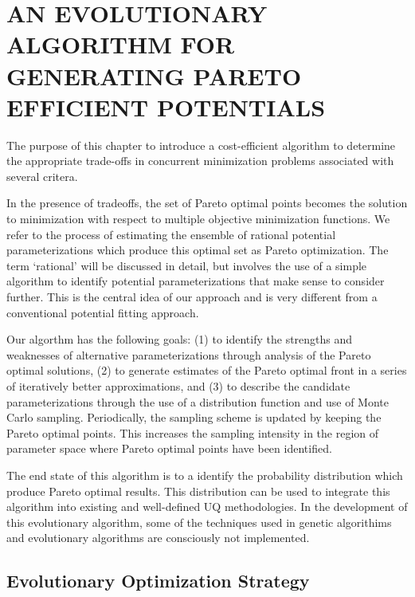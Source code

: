 \chapter{AN EVOLUTIONARY ALGORITHM FOR GENERATING PARETO EFFICIENT POTENTIALS}
\label{ch:methodology}

The purpose of this chapter to introduce a cost-efficient algorithm to determine the appropriate trade-offs in concurrent minimization problems associated with several critera.

In the presence of tradeoffs, the set of Pareto optimal points becomes the solution to minimization with respect to multiple objective minimization functions.  We refer to the process of estimating the ensemble of rational potential parameterizations which produce this optimal set as Pareto optimization.   The term ‘rational’ will be discussed in detail, but involves the use of a simple algorithm to identify potential parameterizations that make sense to consider further. This is the central idea of our approach and is very different from a conventional potential fitting approach.

Our algorthm has the following goals: (1) to identify the strengths and weaknesses of alternative parameterizations through analysis of the Pareto optimal solutions, (2) to generate estimates of the Pareto optimal front in a series of iteratively better approximations, and (3) to describe the candidate parameterizations through the use of a distribution function and use of Monte Carlo sampling.  Periodically, the sampling scheme is updated by keeping the Pareto optimal points.  This increases the sampling intensity in the region of parameter space where Pareto optimal points have been identified.

The end state of this algorithm is to a identify the probability distribution which produce Pareto optimal results.  This distribution can be used to integrate this algorithm into existing and well-defined UQ methodologies.  In the development of this evolutionary algorithm, some of the techniques used in genetic algorithims and evolutionary algorithms are consciously not implemented.

\section{Evolutionary Optimization Strategy}
\label{sec:strategy}


